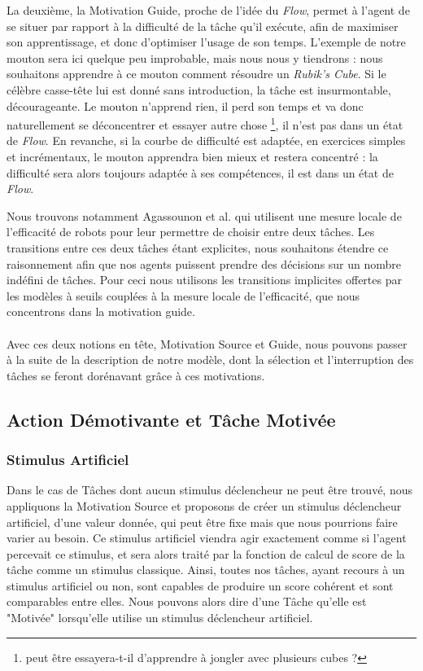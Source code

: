         La deuxième, la Motivation Guide, proche de l'idée du \textit{Flow}, permet à l'agent de se situer par rapport à la difficulté de la tâche qu'il exécute, afin de maximiser son apprentissage, et donc d'optimiser l'usage de son temps. L'exemple de notre mouton sera ici quelque peu improbable, mais nous nous y tiendrons : nous souhaitons apprendre à ce mouton comment résoudre un \textit{Rubik's Cube}. Si le célèbre casse-tête lui est donné sans introduction, la tâche est insurmontable, décourageante. Le mouton n'apprend rien, il perd son temps et va donc naturellement se déconcentrer et essayer autre chose \footnote{peut être essayera-t-il d'apprendre à jongler avec plusieurs cubes ?}, il n'est pas dans un état de \textit{Flow}. En revanche, si la courbe de difficulté est adaptée, en exercices simples et incrémentaux, le mouton apprendra bien mieux et restera concentré : la difficulté sera alors toujours adaptée à ses compétences, il est dans un état de \textit{Flow}.
        
        Nous trouvons notamment Agassounon et al. \cite{agassounon_scalable_2001} qui utilisent une mesure locale de l'efficacité de robots pour leur permettre de choisir entre deux tâches. Les transitions entre ces deux tâches étant explicites, nous souhaitons étendre ce raisonnement afin que nos agents puissent prendre des décisions sur un nombre indéfini de tâches. Pour ceci nous utilisons les transitions implicites offertes par les modèles à seuils couplées à la mesure locale de l'efficacité, que nous concentrons dans la motivation guide.
        
        \paragraph{}
        Avec ces deux notions en tête, Motivation Source et Guide, nous pouvons passer à la suite de la description de notre modèle, dont la sélection et l'interruption des tâches se feront dorénavant grâce à ces motivations.
        
        
		\subsection{Action Démotivante et Tâche Motivée}
		\label{sectionInterruption}
		
		\subsubsection{Stimulus Artificiel}
			Dans le cas de Tâches dont aucun stimulus déclencheur ne peut être trouvé, nous appliquons la Motivation Source et proposons de créer un stimulus déclencheur artificiel, d'une valeur donnée, qui peut être fixe mais que nous pourrions faire varier au besoin. Ce stimulus artificiel viendra agir exactement comme si l'agent percevait ce stimulus, et sera alors traité par la fonction de calcul de score de la tâche comme un stimulus classique. Ainsi, toutes nos tâches, ayant recours à un stimulus artificiel ou non, sont capables de produire un score cohérent et sont comparables entre elles. Nous pouvons alors dire d'une Tâche qu'elle est "Motivée" lorsqu'elle utilise un stimulus déclencheur artificiel.
			

